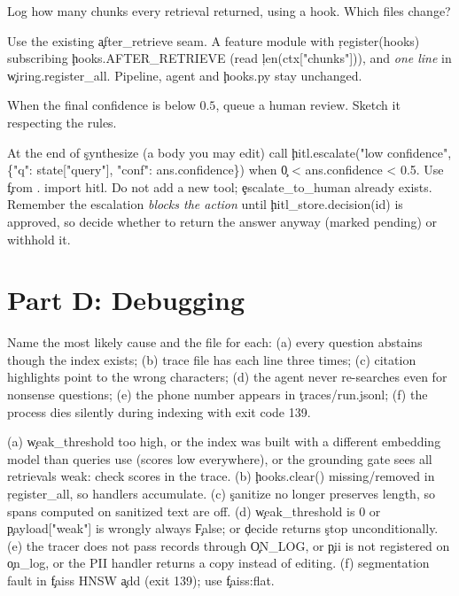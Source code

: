\begin{problem}
Log how many chunks every retrieval returned, using a hook. Which files change?
\end{problem}
\begin{solution}
Use the existing \c{after\_retrieve} seam. A feature module with \c{register(hooks)} subscribing \c{hooks.AFTER\_RETRIEVE} (read \c{len(ctx["chunks"])}), and \emph{one line} in \c{wiring.register\_all}. Pipeline, agent and \c{hooks.py} stay unchanged.
\end{solution}

\begin{problem}
When the final confidence is below $0.5$, queue a human review. Sketch it respecting the rules.
\end{problem}
\begin{solution}
At the end of \c{synthesize} (a body you may edit) call \c{hitl.escalate("low confidence", \{"q": state["query"], "conf": ans.confidence\})} when \c{0 < ans.confidence < 0.5}. Use \c{from . import hitl}. Do not add a new tool; \c{escalate\_to\_human} already exists. Remember the escalation \emph{blocks the action} until \c{hitl\_store.decision(id)} is approved, so decide whether to return the answer anyway (marked pending) or withhold it.
\end{solution}

\section*{Part D: Debugging}
\begin{problem}[Symptoms]
Name the most likely cause and the file for each: (a) every question abstains though the index exists; (b) trace file has each line three times; (c) citation highlights point to the wrong characters; (d) the agent never re-searches even for nonsense questions; (e) the phone number appears in \c{traces/run.jsonl}; (f) the process dies silently during indexing with exit code 139.
\end{problem}
\begin{solution}
(a) \c{weak\_threshold} too high, or the index was built with a different embedding model than queries use (scores low everywhere), or the grounding gate sees all retrievals weak: check scores in the trace. (b) \c{hooks.clear()} missing/removed in \c{register\_all}, so handlers accumulate. (c) \c{sanitize} no longer preserves length, so spans computed on sanitized text are off. (d) \c{weak\_threshold} is $0$ or \c{payload["weak"]} is wrongly always \c{False}; or \c{decide} returns \c{stop} unconditionally. (e) the tracer does not pass records through \c{ON\_LOG}, or \c{pii} is not registered on \c{on\_log}, or the PII handler returns a copy instead of editing. (f) segmentation fault in \c{faiss} HNSW \c{add} (exit 139); use \c{faiss:flat}.
\end{solution}

